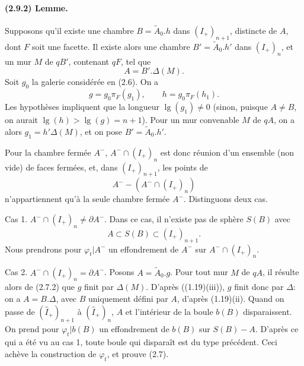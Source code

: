 \documentclass[10pt,a4paper]{article}
\begin{document}
\paragraph{(2.9.2) Lemme.} Supposons qu'il existe une chambre \(B=\widetilde A_0.h\) dans \((I_+)_{n+1}\), distincte de \(A\), dont \(F\) soit une facette. Il existe alors une chambre \(B'=\widetilde A_0.h'\) dans \((I_+)_n\), et un mur \(M\) de \(qB'\), contenant \(qF\), tel que
\[
A=B'.\Delta(M).
\]
Soit \(g_0\) la galerie considérée en (2.6). On a
\[
g=g_0\pi_F(g_1),\qquad h=g_0\pi_F(h_1).
\]
Les hypothèses impliquent que la longueur \(\operatorname{lg}(g_1)\ne0\) (sinon, puisque \(A\ne B\), on aurait \(\operatorname{lg}(h)>\operatorname{lg}(g)=n+1\)). Pour un mur convenable \(M\) de \(qA\), on a alors \(g_1=h'\Delta(M)\), et on pose \(B'=\widetilde A_0.h'\).

Pour la chambre fermée \(A^{-}\), \(A^{-}\cap(I_+)_n\) est donc réunion d'un ensemble (non vide) de faces fermées, et, dans \((I_+)_{n+1}\), les points de
\[
A^{-}-(A^{-}\cap(I_+)_n)
\]
n'appartiennent qu'à la seule chambre fermée \(A^{-}\). Distinguons deux cas.

Cas 1. \(A^{-}\cap(I_+)_n\ne\partial A^{-}\). Dans ce cas, il n'existe pas de sphère \(S(B)\) avec
\[
A\subset S(B)\subset (I_+)_{n+1}.
\]
Nous prendrons pour \(\varphi_t|A^{-}\) un effondrement de \(A^{-}\) sur \(A^{-}\cap(I_+)_n\).

Cas 2. \(A^{-}\cap(I_+)_n=\partial A^{-}\). Posons \(A=\widetilde A_0.g\). Pour tout mur \(M\) de \(qA\), il résulte alors de (2.7.2) que \(g\) finit par \(\Delta(M)\). D'après ((1.19)(iii)), \(g\) finit donc par \(\Delta\): on a \(A=B.\Delta\), avec \(B\) uniquement défini par \(A\), d'après (1.19)(ii). Quand on passe de \((\widehat I_+)_{n+1}\) à \((\widehat I_+)_n\), \(A\) et l'intérieur de la boule \(b(B)\) disparaissent. On prend pour \(\varphi_t|b(B)\) un effondrement de \(b(B)\) sur \(S(B)-A\). D'après ce qui a été vu au cas 1, toute boule qui disparaît est du type précédent. Ceci achève la construction de \(\varphi_t\), et prouve (2.7).
\end{document}
